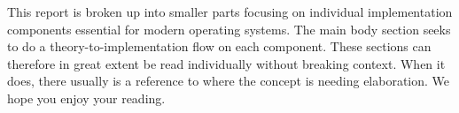 
This report is broken up into smaller parts focusing on individual implementation components essential for modern operating systems. The main body section seeks to do a theory-to-implementation flow on each component. These sections can therefore in great extent be read individually without breaking context. When it does, there usually is a reference to where the concept is needing elaboration. We hope you enjoy your reading.